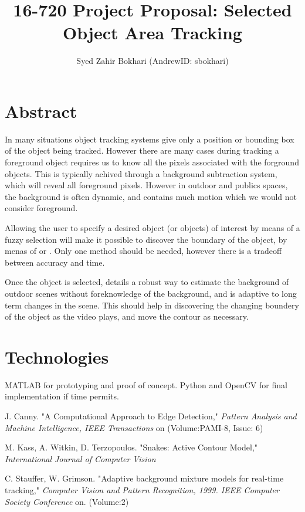 \documentclass[11pt]{exam}
\begin{document}
\title{16-720 Project Proposal: Selected Object Area Tracking}
\date{}
\author{Syed Zahir Bokhari (AndrewID: sbokhari)}

\maketitle

\section{Abstract}
In many situations object tracking systems give only a position or bounding box
of the object being tracked. However there are many cases during tracking a
foreground object requires us to know all the pixels associated with the
forground objects. This is typically achived through a background subtraction
system, which will reveal all foreground pixels. However in outdoor and publics
spaces, the background is often dynamic, and contains much motion which we would
not consider foreground.

Allowing the user to specify a desired object (or objects) of interest by means
of a fuzzy selection will make it possible to discover the boundary of the
object, by menas of \cite{canny} or \cite{snakes}. Only one method should be
needed, however there is a tradeoff between accuracy and time.

Once the object is selected, \cite{bacsub} details a robust way to estimate the
background of outdoor scenes without foreknowledge of the background, and is
adaptive to long term changes in the scene. This should help in discovering the
changing boundery of the object as the video plays, and move the contour as
necessary.

\section{Technologies}
MATLAB for prototyping and proof of concept. Python and OpenCV for final
implementation if time permits.

\begin{thebibliography}{9}
J. Canny.
"A Computational Approach to Edge Detection,"
\emph{Pattern Analysis and Machine Intelligence, IEEE Transactions} on
(Volume:PAMI-8, Issue: 6)

M. Kass, A. Witkin, D. Terzopoulos.
"Snakes: Active Contour Model,"
\emph{International Journal of Computer Vision}

C. Stauffer, W. Grimson.
"Adaptive background mixture models for real-time tracking,"
\emph{Computer Vision and Pattern Recognition, 1999. IEEE Computer Society
Conference} on. (Volume:2)

\end{thebibliography}
\end{document}
